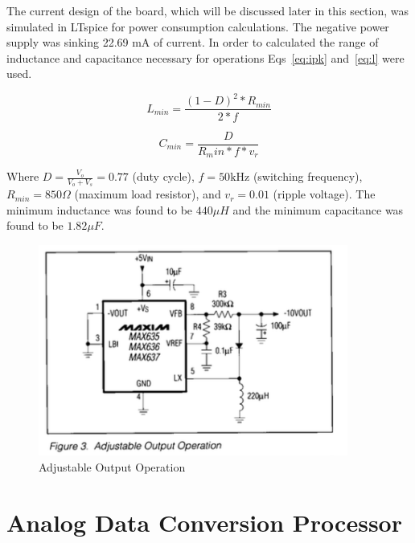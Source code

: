 \documentclass[12pt,journal]{IEEEtran}
\begin{document}
The current design of the board, which will be discussed later in this section, was simulated in LTspice for power consumption calculations. The negative power supply was sinking 22.69 mA of current. In order to calculated the range of inductance and capacitance necessary for operations Eqs~\ref{eq:ipk} and~\ref{eq:l} were used. 

\begin{equation}
L_{min} = \frac{(1-D)^2 * R_{min}}{2*f}
\label{eq:ipk}
\end{equation}

\begin{equation}
C_{min} = \frac{D}{R_min*f*v_r}
\label{eq:l}
\end{equation}

Where $D = \frac{V_o}{V_o + V_s} = 0.77$ (duty cycle), $f = 50\text{kHz}$ (switching frequency), $R_{min} = 850\Omega$ (maximum load resistor), and $v_r = 0.01$ (ripple voltage). The minimum inductance was found to be $440\mu H$ and the minimum capacitance was found to be $1.82\mu F$. 

\begin{figure}
	\centering
	\includegraphics[width=4in]{./max635.png}
	\caption{Adjustable Output Operation~\cite{MAX635}}
	\label{fig{max635}}
\end{figure}



\section{Analog Data Conversion Processor}\label{processor}
\end{document}
